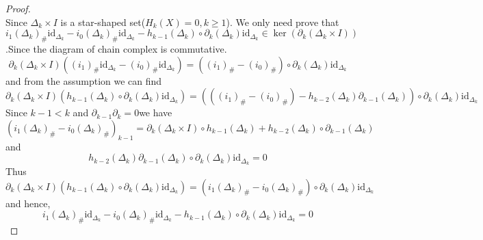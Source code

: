\documentclass{article}
\begin{document}
\begin{proof}
$$$$
Since $\Delta_k \times I$ is a star-shaped set($H_k(X) = 0,k\geq 1$). We only need prove that $i_1(\Delta_k)_\#\text{id}_{\Delta_k} - i_0(\Delta_k)_\#\text{id}_{\Delta_k} -h_{k-1} (\Delta_k)\circ \partial_{k}(\Delta_k)\text{id}_{\Delta_k} \in \ker(\partial_{k}(\Delta_k \times I))$.Since the diagram of chain complex is commutative.
$$
\partial_{k}(\Delta_k \times I)((i_1)_\#\text{id}_{\Delta_k} - (i_0)_\#\text{id}_{\Delta_k})= ((i_1)_\# - (i_0)_\#)\circ \partial_k(\Delta_k) \text{id}_{\Delta_k}
$$
and from the assumption we can find
$$
\partial_{k}(\Delta_k \times I)(h_{k-1} (\Delta_k)\circ \partial_{k}(\Delta_k)\text{id}_{\Delta_k}) = (((i_1)_\# - (i_0)_\#) - h_{k-2}(\Delta_k)\partial_{k-1}(\Delta_k))\circ \partial_k(\Delta_k)\text{id}_{\Delta_k}
$$
Since $k-1 <k$ and $\partial_{k-1} \partial_{k} = 0$we have
$$
(i_1(\Delta_k)_\# - i_0(\Delta_k)_\#)_{k-1} = \partial_{k}(\Delta_k \times I) \circ h_{k-1}(\Delta_k) + h_{k-2}(\Delta_k)\circ \partial_{k-1}(\Delta_k)
$$
and
$$
h_{k-2}(\Delta_k)\partial_{k-1}(\Delta_k)\circ \partial_k(\Delta_k)\text{id}_{\Delta_k} =0
$$
Thus
$$
\partial_{k}(\Delta_k \times I)(h_{k-1} (\Delta_k)\circ \partial_{k}(\Delta_k)\text{id}_{\Delta_k}) = (i_1(\Delta_k)_\# - i_0(\Delta_k)_\#)\circ \partial_k(\Delta_k)\text{id}_{\Delta_k}
$$
and hence, 
$$
i_1(\Delta_k)_\#\text{id}_{\Delta_k} - i_0(\Delta_k)_\#\text{id}_{\Delta_k} -h_{k-1} (\Delta_k)\circ \partial_{k}(\Delta_k)\text{id}_{\Delta_k} = 0
$$
\end{proof}
\end{document}

